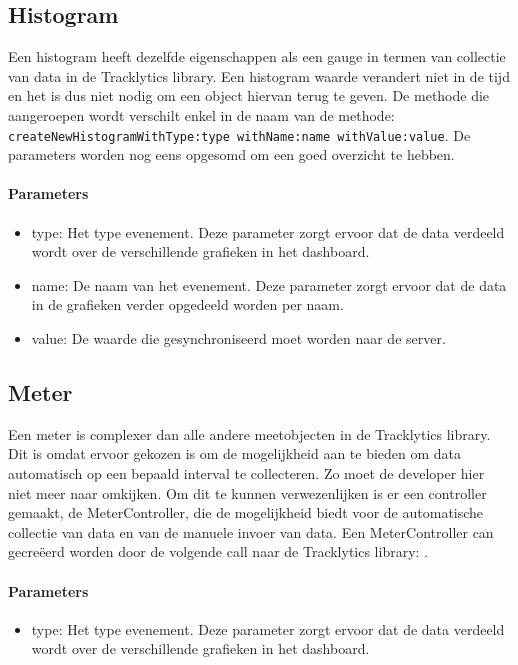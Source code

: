 \subsection{Histogram}
Een histogram heeft dezelfde eigenschappen als een gauge in termen van collectie van data in de Tracklytics library. Een histogram waarde verandert niet in de tijd en het is dus niet nodig om een object hiervan terug te geven. De methode die aangeroepen wordt verschilt enkel in de naam van de methode: \texttt{\justify  createNewHistogramWithType:type withName:name withValue:value}. De parameters worden nog eens opgesomd om een goed overzicht te hebben.

\paragraph{Parameters}
\begin{itemize}
\item type: Het type evenement. Deze parameter zorgt ervoor dat de data verdeeld wordt over de verschillende grafieken in het dashboard.
\item name: De naam van het evenement. Deze parameter zorgt ervoor dat de data in de grafieken verder opgedeeld worden per naam.
\item value: De waarde die gesynchroniseerd moet worden naar de server.
\end{itemize}


\subsection{Meter}
Een meter is complexer dan alle andere meetobjecten in de Tracklytics library. Dit is omdat ervoor gekozen is om de mogelijkheid aan te bieden om data automatisch op een bepaald interval te collecteren. Zo moet de developer hier niet meer naar omkijken. Om dit te kunnen verwezenlijken is er een controller gemaakt, de MeterController, die de mogelijkheid biedt voor de automatische collectie van data en van de manuele invoer van data. Een MeterController can gecre\"eerd worden door de volgende call naar de Tracklytics library: \texttt{}. 

\paragraph{Parameters}
\begin{itemize}
\item type: Het type evenement. Deze parameter zorgt ervoor dat de data verdeeld wordt over de verschillende grafieken in het dashboard.
\end{itemize}

